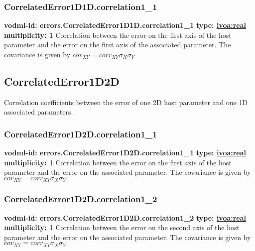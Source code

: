     \subsubsection{CorrelatedError1D1D.correlation1\_1}
      \textbf{vodml-id: errors.CorrelatedError1D1D.correlation1\_1} \newline
      \textbf{type: \hyperref[sect:ivoa]{ivoa:real}} \newline
      \textbf{multiplicity: 1} \newline 
      Correlation between the error on the first axis of the host parameter and the error on the first axis of the associated parameter. The covariance is given by $cov_{XY}=corr_{XY}\sigma_{X}\sigma_{Y}$

  \subsection{CorrelatedError1D2D}
  \label{sect:errors.CorrelatedError1D2D}
    Correlation coefficients between the error of one 2D host parameter and one 1D associated parameters.

    \subsubsection{CorrelatedError1D2D.correlation1\_1}
      \textbf{vodml-id: errors.CorrelatedError1D2D.correlation1\_1} \newline
      \textbf{type: \hyperref[sect:ivoa]{ivoa:real}} \newline
      \textbf{multiplicity: 1} \newline 
      Correlation between the error on the first axis of the host parameter and the error on the associated parameter. The covariance is given by $cov_{XY}=corr_{XY}\sigma_{X}\sigma_{Y}$

    \subsubsection{CorrelatedError1D2D.correlation1\_2}
      \textbf{vodml-id: errors.CorrelatedError1D2D.correlation1\_2} \newline
      \textbf{type: \hyperref[sect:ivoa]{ivoa:real}} \newline
      \textbf{multiplicity: 1} \newline 
      Correlation between the error on the second axis of the host parameter and the error on the associated parameter. The covariance is given by $cov_{XY}=corr_{XY}\sigma_{X}\sigma_{Y}$


